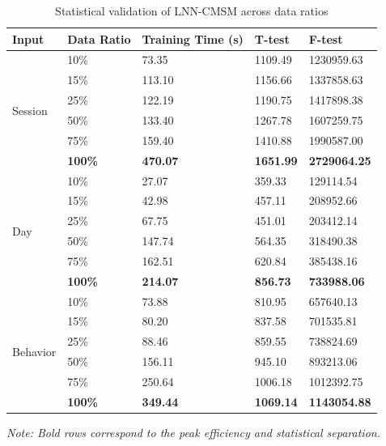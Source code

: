 \begin{table}[!ht]
\centering
\caption{Statistical validation of LNN-CMSM across data ratios}
\label{tab:ratio_stats}
\renewcommand{\arraystretch}{1.3}
\small
\begin{tabular}{|l|l|l|l|l|}
\hline
\textbf{Input} & \textbf{Data Ratio} & \textbf{Training Time (s)} & \textbf{T-test} & \textbf{F-test} \\
\hline
\multirow{6}{*}{Session} 
 & 10\%  & 73.35 & 1109.49 & 1230959.63 \\
\cline{2-5}
 & 15\%  & 113.10 & 1156.66 & 1337858.63 \\
\cline{2-5}
 & 25\%  & 122.19 & 1190.75 & 1417898.38 \\
\cline{2-5}
 & 50\%  & 133.40 & 1267.78 & 1607259.75 \\
\cline{2-5}
 & 75\%  & 159.40 & 1410.88 & 1990587.00 \\
\cline{2-5}
 & \textbf{100\%} & \textbf{470.07} & \textbf{1651.99} & \textbf{2729064.25} \\
\hline
\multirow{6}{*}{Day} 
 & 10\%  & 27.07 & 359.33 & 129114.54 \\
\cline{2-5}
 & 15\%  & 42.98 & 457.11 & 208952.66 \\
\cline{2-5}
 & 25\%  & 67.75 & 451.01 & 203412.14 \\
\cline{2-5}
 & 50\%  & 147.74 & 564.35 & 318490.38 \\
\cline{2-5}
 & 75\%  & 162.51 & 620.84 & 385438.16 \\
\cline{2-5}
 & \textbf{100\%} & \textbf{214.07} & \textbf{856.73} & \textbf{733988.06} \\
\hline
\multirow{6}{*}{Behavior} 
 & 10\%  & 73.88 & 810.95 & 657640.13 \\
\cline{2-5}
 & 15\%  & 80.20 & 837.58 & 701535.81 \\
\cline{2-5}
 & 25\%  & 88.46 & 859.55 & 738824.69 \\
\cline{2-5}
 & 50\%  & 156.11 & 945.10 & 893213.06 \\
\cline{2-5}
 & 75\%  & 250.64 & 1006.18 & 1012392.75 \\
\cline{2-5}
 & \textbf{100\%} & \textbf{349.44} & \textbf{1069.14} & \textbf{1143054.88} \\
\hline
\end{tabular}

\vspace{2mm}
\scriptsize{\textit{Note: Bold rows correspond to the peak efficiency and statistical separation.}}
\end{table}

